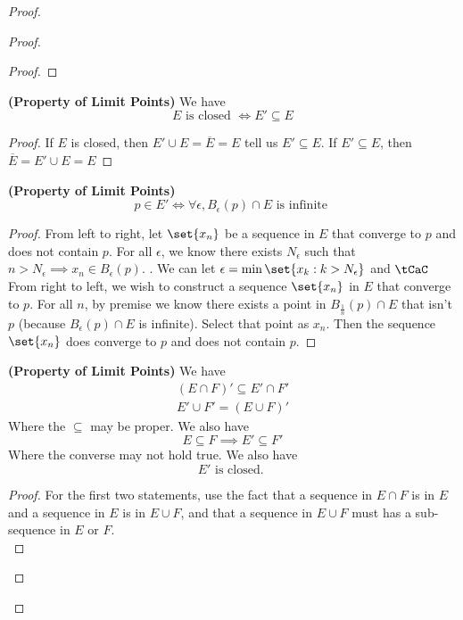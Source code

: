 \documentclass{report}
\begin{document}
\begin{proof}
\begin{proof}
\begin{proof}
\end{proof}
\begin{corollary}
\label{3.2.8}
\textbf{(Property of Limit Points)} We have
\begin{equation*}
E\text{ is closed }\iff  E'\subseteq E
\end{equation*}
\end{corollary}
\begin{proof}
If $E$ is closed, then  $E'\cup E=\overline{E}=E$ tell us $E'\subseteq E$. If $E'\subseteq E$, then $\overline{E}=E'\cup E=E$
\end{proof}
\begin{theorem}
\label{3.2.9}
\textbf{(Property of Limit Points)} 
\begin{equation*}
p\in E'\iff \forall \epsilon, B_\epsilon (p)\cap E\text{ is infinite }
\end{equation*}
\end{theorem}
\begin{proof}
  From left to right, let $\set{x_n}$ be a sequence in $E$ that converge to $p$ and does not contain  $p$. For all $\epsilon$, we know there exists $N_\epsilon $ such that $n>N_\epsilon \implies x_n\in B_\epsilon (p)$. . We can let $\epsilon=\min \set{x_k:k>N_\epsilon }$ and $\tCaC$\\

From right to left, we wish to construct a sequence $\set{x_n}$ in $E$ that converge to $p$. For all $n$, by premise we know there exists a point in  $B_{\frac{1}{n}}(p)\cap E$ that isn't $p$  (because $B_{\epsilon }(p)\cap E$ is infinite). Select that point as $x_n$. Then the sequence $\set{x_n}$ does converge to $p$ and does not contain $p$.
\end{proof}
\begin{theorem}
\label{3.2.10}
\textbf{(Property of Limit Points)} We have
\begin{gather*}
(E\cap F)'\subseteq E'\cap F'\\
E'\cup F'=(E\cup F)'
\end{gather*}
Where the $\subseteq$ may be proper. We also have
\begin{equation*}
E\subseteq F\implies E'\subseteq F'
\end{equation*}
Where the converse may not hold true. We also have
\begin{equation*}
E'\text{ is closed. }
\end{equation*}
\end{theorem}
\begin{proof}
For the first two statements, use the fact that a sequence in $E\cap F$ is in $E$ and a sequence in  $E$ is in $E\cup F$, and that a sequence in $E\cup F$ must has a sub-sequence in $E$ or $F$.\\


\end{proof}
\end{proof}
\end{proof}
\end{document}
